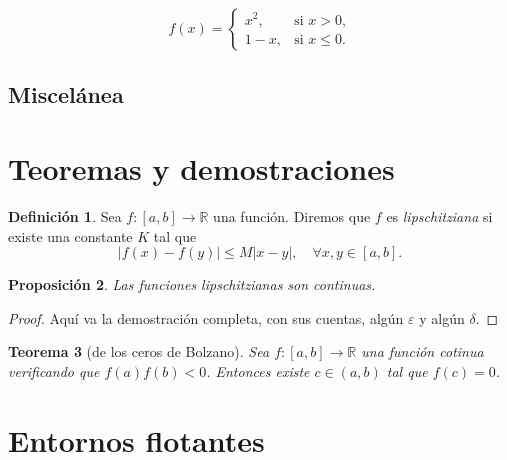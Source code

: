 \documentclass{article}
\numberwithin{equation}{section}
\theoremstyle{plain}
\newtheorem{teorema}{Teorema}[section]
\newtheorem{prop}[teorema]{Proposición}
\theoremstyle{definition}
\newtheorem{definicion}[teorema]{Definición}
\theoremstyle{remark}
\begin{document}
\[	
f(x) = \begin{cases}
			x^2, & \text{si $x>0$,} \\
			1-x, & \text{si $x \leq 0$.}
	   \end{cases}
\]			


\subsection{Miscelánea} \label{sec:misc-ecuaciones}








\section{Teoremas y demostraciones}





\begin{definicion}
Sea $f \colon [a,b] \to \mathbb{R}$ una función. Diremos que $f$ es \emph{lipschitziana} si existe una constante $K$ tal que 
\[
\left| f(x)-f(y) \right| \leq M \left| x-y \right|, \quad \forall x,y \in [a,b].
\]
\end{definicion}

\begin{prop}
Las funciones lipschitzianas son continuas.
\end{prop}
\begin{proof}
Aquí va la demostración completa, con sus cuentas, algún $\varepsilon$ y algún $\delta$.
\end{proof}

\begin{teorema}[de los ceros de Bolzano]
Sea $f \colon [a,b] \to \mathbb{R}$ una función cotinua verificando que $f(a)f(b)<0$. Entonces existe $c \in (a,b)$ tal que $f(c)=0$.
\end{teorema}


\section{Entornos flotantes}
\end{document}
